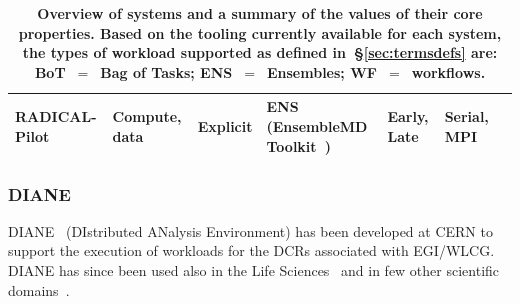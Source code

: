 \documentclass{sig-alternate}
\begin{document}
\begin{table}
\begin{tabular}{p{2.5cm}p{2.25cm}p{2cm}p{5cm}p{1.75cm}p{1.75cm}p{1.75cm}|}
    RADICAL-Pilot &
    Compute, data &
    Explicit &
    ENS (EnsembleMD Toolkit~\cite{emdtoolkit_url}) &
    Early, Late &
    Serial, MPI \\

 \bottomrule

 \end{tabular}
 \caption{\textbf{Overview of \pilot systems and a summary of the values of
 their core properties. Based on the tooling currently available for each \pilot system, the types of workload supported as defined in~\S\ref{sec:termsdefs} are: BoT~$=$~Bag of Tasks; ENS~$=$~Ensembles; WF~$=$~workflows.} }
 \label{table:implementations-properties}
\end{table}





%
\subsubsection{DIANE}\label{sec:diane}

DIANE~\cite{moscicki2003diane} (DIstributed ANalysis Environment) has been
developed at CERN to support the execution of workloads for the DCRs associated
with EGI/WLCG. DIANE has since been used also in the Life
Sciences~\cite{moscicki2004biomedical,jacq2007virtual,moscicki2003} and in few
other scientific domains~\cite{bacu2011gswat,mantero2003simulation}.
\end{document}
